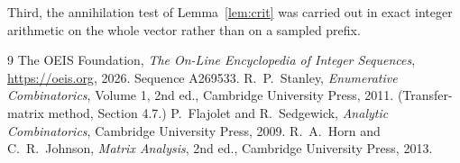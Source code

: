 \documentclass[11pt,a4paper]{article}
\theoremstyle{plain}
\theoremstyle{definition}
\begin{document}
Third, the annihilation test of Lemma~\ref{lem:crit} was carried out in exact integer
arithmetic on the whole vector rather than on a sampled prefix.

\begin{thebibliography}{9}
 The OEIS Foundation, \emph{The On-Line Encyclopedia of Integer
Sequences}, \url{https://oeis.org}, 2026. Sequence A269533.
 R.~P.~Stanley, \emph{Enumerative Combinatorics}, Volume 1, 2nd ed.,
Cambridge University Press, 2011. (Transfer-matrix method, Section 4.7.)
 P.~Flajolet and R.~Sedgewick, \emph{Analytic Combinatorics}, Cambridge
University Press, 2009.
 R.~A.~Horn and C.~R.~Johnson, \emph{Matrix Analysis}, 2nd ed., Cambridge
University Press, 2013.
\end{thebibliography}
\end{document}
